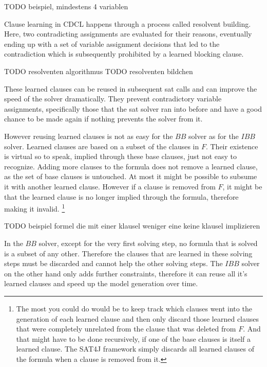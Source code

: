 TODO beispiel, mindestens 4 variablen 

Clause learning in CDCL happens through a process called resolvent building. Here, two contradicting assignments are evaluated for their reasons, eventually ending up with a set of variable assignment decisions that led to the contradiction which is subsequently prohibited by a learned blocking clause.

TODO resolventen algorithmus \newline
TODO resolventen bildchen 

These learned clauses can be reused in subsequent sat calls and can improve the speed of the solver dramatically. They prevent contradictory variable assignments, specifically those that the sat solver ran into before and have a good chance to be made again if nothing prevents the solver from it. 

However reusing learned clauses is not as easy for the $BB$ solver as for the $IBB$ solver. Learned clauses are based on a subset of the clauses in $F$. Their existence is virtual so to speak, implied through these base clauses, just not easy to recognize. Adding more clauses to the formula does not remove a learned clause, as the set of base clauses is untouched. At most it might be possible to subsume it with another learned clause. However if a clause is removed from $F$, it might be that the learned clause is no longer implied through the formula, therefore making it invalid. 
\footnote{
The most you could do would be to keep track which clauses went into the generation of each learned clause and then only discard those learned clauses that were completely unrelated from the clause that was deleted from $F$. And that might have to be done recursively, if one of the base clauses is itself a learned clause. The SAT4J framework simply discards all learned clauses of the formula when a clause is removed from it.}

TODO beispiel formel die mit einer klausel weniger eine keine klausel implizieren


In the $BB$ solver, except for the very first solving step, no formula that is solved is a subset of any other. Therefore the clauses that are learned in these solving steps must be discarded and cannot help the other solving steps. The $IBB$ solver on the other hand only adds further constraints, therefore it can reuse all it's learned clauses and speed up the model generation over time.

